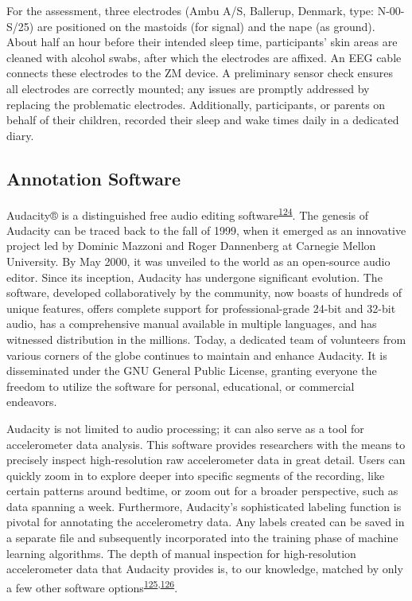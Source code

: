 \documentclass[
  10pt,
]{scrbook}
\begin{document}
For the assessment, three electrodes (Ambu A/S, Ballerup, Denmark, type:
N-00-S/25) are positioned on the mastoids (for signal) and the nape (as
ground). About half an hour before their intended sleep time,
participants' skin areas are cleaned with alcohol swabs, after which the
electrodes are affixed. An EEG cable connects these electrodes to the ZM
device. A preliminary sensor check ensures all electrodes are correctly
mounted; any issues are promptly addressed by replacing the problematic
electrodes. Additionally, participants, or parents on behalf of their
children, recorded their sleep and wake times daily in a dedicated
diary.

\hypertarget{annotation-software}{%
\subsection{Annotation Software}\label{annotation-software}}

Audacity®️ is a distinguished free audio editing
software\textsuperscript{\protect\hyperlink{ref-audacity}{124}}. The
genesis of Audacity can be traced back to the fall of 1999, when it
emerged as an innovative project led by Dominic Mazzoni and Roger
Dannenberg at Carnegie Mellon University. By May 2000, it was unveiled
to the world as an open-source audio editor. Since its inception,
Audacity has undergone significant evolution. The software, developed
collaboratively by the community, now boasts of hundreds of unique
features, offers complete support for professional-grade 24-bit and
32-bit audio, has a comprehensive manual available in multiple
languages, and has witnessed distribution in the millions. Today, a
dedicated team of volunteers from various corners of the globe continues
to maintain and enhance Audacity. It is disseminated under the GNU
General Public License, granting everyone the freedom to utilize the
software for personal, educational, or commercial endeavors.

Audacity is not limited to audio processing; it can also serve as a tool
for accelerometer data analysis. This software provides researchers with
the means to precisely inspect high-resolution raw accelerometer data in
great detail. Users can quickly zoom in to explore deeper into specific
segments of the recording, like certain patterns around bedtime, or zoom
out for a broader perspective, such as data spanning a week.
Furthermore, Audacity's sophisticated labeling function is pivotal for
annotating the accelerometry data. Any labels created can be saved in a
separate file and subsequently incorporated into the training phase of
machine learning algorithms. The depth of manual inspection for
high-resolution accelerometer data that Audacity provides is, to our
knowledge, matched by only a few other software
options\textsuperscript{\protect\hyperlink{ref-visplore}{125},\protect\hyperlink{ref-label_studio}{126}}.
\end{document}
